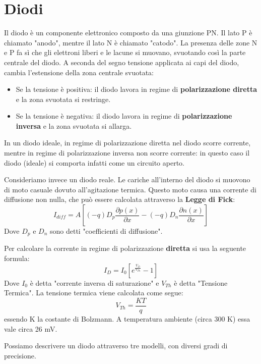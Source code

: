 \documentclass[\main/main.tex]{subfiles}
\begin{document}
\section{Diodi}
Il diodo è un componente elettronico composto da una giunzione PN. 
Il lato P è chiamato "anodo", mentre il lato N è chiamato "catodo". 
La presenza delle zone N e P fa sì che gli elettroni liberi e le lacune si muovano, svuotando così la parte centrale del diodo. 
A seconda del segno tensione applicata ai capi del diodo, cambia l'estensione della zona centrale svuotata: 
\begin{itemize} 
    \item Se la tensione è positiva: il diodo lavora in regime di \textbf{polarizzazione diretta} e la zona svuotata si restringe.  
	\item Se la tensione è negativa: il diodo lavora in regime di \textbf{polarizzazione inversa} e la zona svuotata si allarga.  
\end{itemize}
In un diodo ideale, in regime di polarizzazione diretta nel diodo scorre corrente, mentre in regime di polarizzazione inversa non scorre corrente: in questo caso il diodo (ideale) si comporta infatti come un circuito aperto. 

Consideriamo invece un diodo reale. 
Le cariche all'interno del diodo si muovono di moto casuale dovuto all'agitazione termica. Questo moto causa una corrente di diffusione non nulla, che può essere calcolata attraverso la \textbf{Legge di Fick}:
\[I_{diff} = A \left[(-q)D_p\frac{\partial p(x)}{\partial x} - (-q)D_n\frac{\partial n(x)}{\partial x} \right]\]
Dove  $D_{p}$ e  $D_{n} $ sono detti "coefficienti di diffusione".

Per calcolare la corrente in regime di polarizzazione \textbf{diretta} si usa la seguente formula:
\[I_D = I_0 \left[e^{\frac{V_D}{V_{Th}}}-1 \right]\]
Dove  $I_0$ è detta "corrente inversa di saturazione" e  $V_{Th} $ è detta "Tensione Termica".
La tensione termica viene calcolata come segue:
\[V_{Th} = \frac{KT}{q}\]
essendo K la costante di Bolzmann. A temperatura ambiente (circa 300 K) essa vale circa 26 mV.

Possiamo descrivere un diodo attraverso tre modelli, con diversi gradi di precisione.
\end{document}

